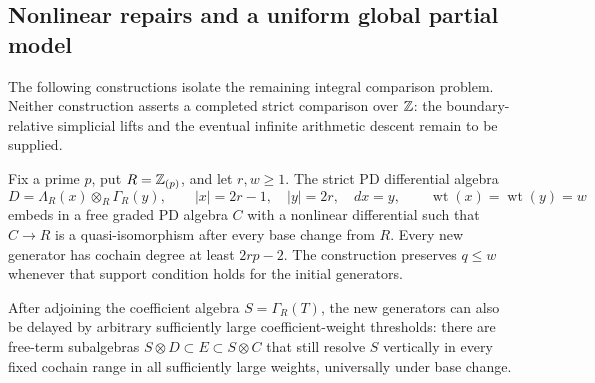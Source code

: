 \subsection{Nonlinear repairs and a uniform global partial model}

The following constructions isolate the remaining integral comparison
problem. Neither construction asserts a completed strict comparison
over $\mathbb Z$: the boundary-relative simplicial lifts and the eventual
infinite arithmetic descent remain to be supplied.

\begin{theorem}
\label{sa08:C18}
Fix a prime $p$, put $R=\mathbb Z_{(p)}$, and let $r,w\geq1$.
The strict PD differential algebra
\[
 D=\Lambda_R(x)\otimes_R\Gamma_R(y),\qquad
 |x|=2r-1,\quad |y|=2r,\quad dx=y,
 \qquad \operatorname{wt}(x)=\operatorname{wt}(y)=w
\]
embeds in a free graded PD algebra $C$ with a nonlinear differential
such that $C\to R$ is a quasi-isomorphism after every base change from
$R$. Every new generator has cochain degree at least $2rp-2$.
The construction preserves $q\leq w$ whenever that support condition
holds for the initial generators.

After adjoining the coefficient algebra $S=\Gamma_R(T)$, the new
generators can also be delayed by arbitrary sufficiently large
coefficient-weight thresholds: there are free-term subalgebras
$S\otimes D\subset E\subset S\otimes C$ that still resolve $S$
vertically in every fixed cochain range in all sufficiently large
weights, universally under base change.
\end{theorem}
